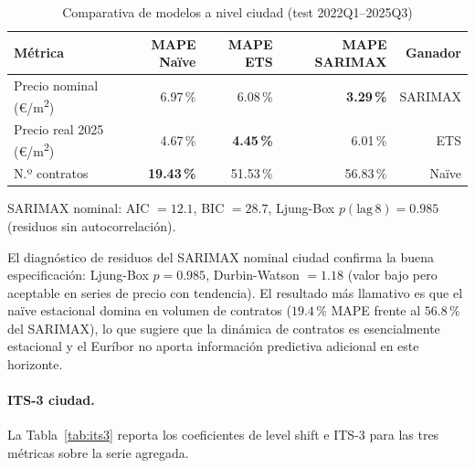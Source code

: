 \documentclass[12pt,a4paper]{article}
\begin{document}
\begin{table}[H]
\caption{Comparativa de modelos a nivel ciudad (test 2022Q1--2025Q3)}
\label{tab:ciudad_comp}
\centering
\small
\begin{threeparttable}
\begin{tabular}{lrrrr}
\toprule
Métrica & MAPE Naïve & MAPE ETS & MAPE SARIMAX & Ganador \\
\midrule
Precio nominal (\euro/m\textsuperscript{2})   & 6.97\,\% & 6.08\,\% & \textbf{3.29\,\%} & SARIMAX \\
Precio real 2025 (\euro/m\textsuperscript{2}) & 4.67\,\% & \textbf{4.45\,\%} & 6.01\,\% & ETS \\
N.º contratos                                 & \textbf{19.43\,\%} & 51.53\,\% & 56.83\,\% & Naïve \\
\bottomrule
\end{tabular}
\begin{tablenotes}
\small\item SARIMAX nominal: AIC $= 12.1$, BIC $= 28.7$,
Ljung-Box $p(\text{lag}\,8) = 0.985$ (residuos sin autocorrelación).
\end{tablenotes}
\end{threeparttable}
\end{table}

El diagnóstico de residuos del SARIMAX nominal ciudad confirma la buena especificación:
Ljung-Box $p = 0.985$, Durbin-Watson $= 1.18$ (valor bajo pero aceptable en series
de precio con tendencia). El resultado más llamativo es que el naïve estacional domina
en volumen de contratos ($19.4$\,\% MAPE frente al $56.8$\,\% del SARIMAX), lo que
sugiere que la dinámica de contratos es esencialmente estacional y el Euríbor no
aporta información predictiva adicional en este horizonte.

\paragraph{ITS-3 ciudad.} La Tabla~\ref{tab:its3} reporta los coeficientes de level
shift e ITS-3 para las tres métricas sobre la serie agregada.
\end{document}
